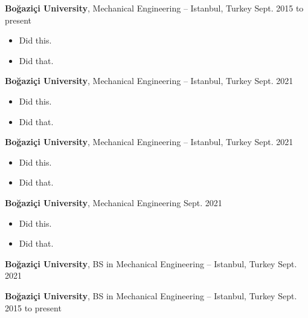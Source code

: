 \documentclass[10pt, letterpaper]{article}
\newenvironment{highlights}{
        \begin{itemize}[
                topsep=0pt,
                partopsep=0pt,
                itemsep=0pt,
                leftmargin=10pt
            ]
    }{
        \end{itemize}
    } %
\begin{document}
        \vspace{8pt}

        \textbf{Boğaziçi University}, Mechanical Engineering -- Istanbul, Turkey \hfill Sept. 2015 to present

        \begin{highlights}
        \item Did this.
        \item Did that.
        \end{highlights}


        \vspace{8pt}

        \textbf{Boğaziçi University}, Mechanical Engineering -- Istanbul, Turkey \hfill Sept. 2021

        \begin{highlights}
        \item Did this.
        \item Did that.
        \end{highlights}


        \vspace{8pt}

        \textbf{Boğaziçi University}, Mechanical Engineering -- Istanbul, Turkey \hfill Sept. 2021

        \begin{highlights}
        \item Did this.
        \item Did that.
        \end{highlights}


        \vspace{8pt}

        \textbf{Boğaziçi University}, Mechanical Engineering \hfill Sept. 2021

        \begin{highlights}
        \item Did this.
        \item Did that.
        \end{highlights}


        \vspace{8pt}

        \textbf{Boğaziçi University}, BS in Mechanical Engineering -- Istanbul, Turkey \hfill Sept. 2021



        \vspace{8pt}

        \textbf{Boğaziçi University}, BS in Mechanical Engineering -- Istanbul, Turkey \hfill Sept. 2015 to present
\end{document}
